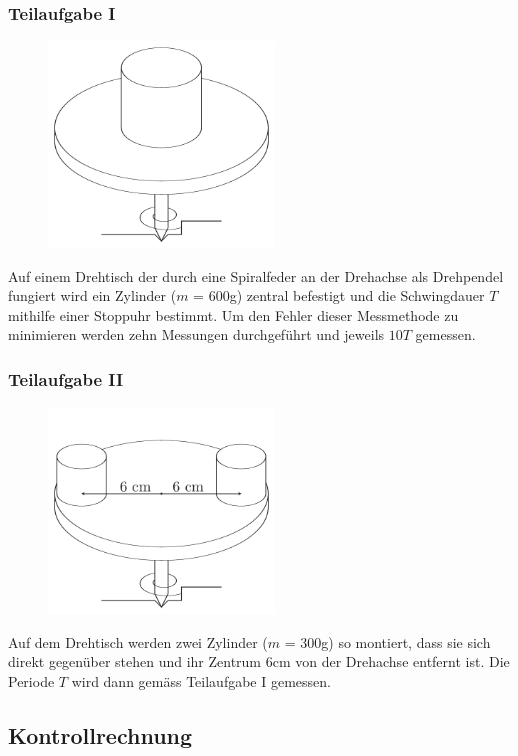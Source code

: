 \documentclass[12pt,a4paper]{article}
\begin{document}
\subsubsection*{Teilaufgabe I}
\begin{figure}
\vspace{-50pt}
\centering
\includegraphics[width=6cm]{illustration11.pdf}
\end{figure}
Auf einem Drehtisch der durch eine Spiralfeder an der Drehachse als Drehpendel fungiert wird ein Zylinder ($m$ = 600g) zentral befestigt und die Schwingdauer $T$ mithilfe einer Stopp\-uhr bestimmt. Um den Fehler dieser Messmethode zu minimieren werden zehn Messungen durchgef\"uhrt und jeweils $10T$ gemessen.

\subsubsection*{Teilaufgabe II}
\begin{figure}
\vspace{-50pt}
\centering
\includegraphics[width=6cm]{illustration12.pdf}
\end{figure}
Auf dem Drehtisch werden zwei Zylinder ($m$ = 300g) so montiert, dass sie sich direkt gegenüber stehen und ihr Zentrum 6cm von der Drehachse entfernt ist. Die Periode $T$ wird dann gemäss Teilaufgabe I gemessen.

\subsection*{Kontrollrechnung}
\end{document}
